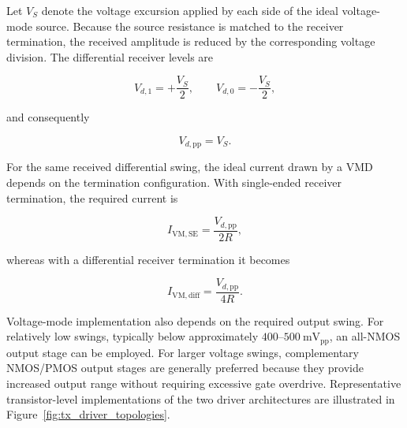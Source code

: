 Let $V_S$ denote the voltage excursion applied by each side of the ideal voltage-mode source. Because the source resistance is matched to the receiver termination, the received amplitude is reduced by the corresponding voltage division. The differential receiver levels are

\begin{equation}
    V_{d,1}=+\frac{V_S}{2},
    \qquad
    V_{d,0}=-\frac{V_S}{2},
\end{equation}

and consequently

\begin{equation}
    V_{d,\mathrm{pp}}=V_S.
    \label{eq:vm_swing}
\end{equation}

For the same received differential swing, the ideal current drawn by a \ac{VMD} depends on the termination configuration. With single-ended receiver termination, the required current is

\begin{equation}
    I_{\mathrm{VM,SE}}
    =\frac{V_{d,\mathrm{pp}}}{2R},
\end{equation}

whereas with a differential receiver termination it becomes

\begin{equation}
    I_{\mathrm{VM,diff}}
    =\frac{V_{d,\mathrm{pp}}}{4R}.
    \label{eq:vm_driver_current}
\end{equation}

Voltage-mode implementation also depends on the required output swing. For relatively low swings, typically below approximately $400$--$500~\mathrm{mV_{pp}}$, an all-NMOS output stage can be employed. For larger voltage swings, complementary NMOS/PMOS output stages are generally preferred because they provide increased output range without requiring excessive gate overdrive.
Representative transistor-level implementations of the two driver architectures are illustrated in Figure~\ref{fig:tx_driver_topologies}.


